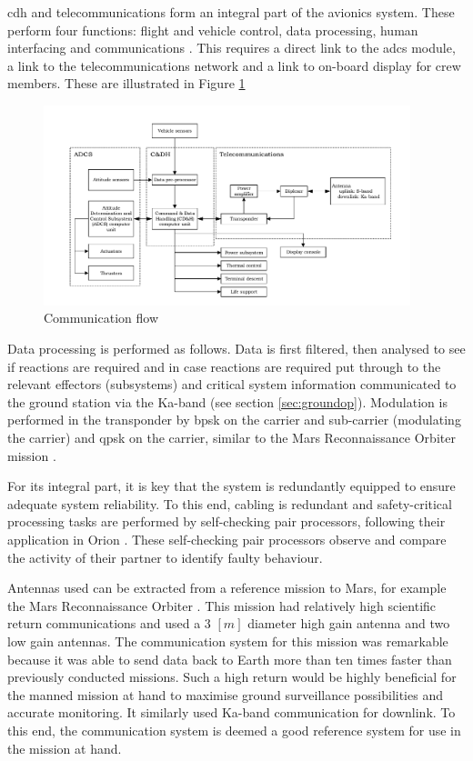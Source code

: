 \acrfull{cdh} and telecommunications form an integral part of the avionics system. These perform four functions: flight and vehicle control, data processing, human interfacing and communications \cite{Eger2008}. This requires a direct link to the \gls{adcs} module, a link to the telecommunications network and a link to on-board display for crew members. These are illustrated in Figure \ref{fig:cdhflow}

\begin{figure}[h]
		\centering
		\includegraphics[width=0.95\textwidth]{./Figure/CrewModule/CDH.pdf}
		\caption{Communication flow}
		\label{fig:cdhflow}
\end{figure}

Data processing is performed as follows. Data is first filtered, then analysed to see if reactions are required and in case reactions are required put through to the relevant effectors (subsystems) and critical system information communicated to the ground station via the Ka-band (see section \ref{sec:groundop}). Modulation is performed in the transponder by \gls{bpsk} on the carrier and sub-carrier (modulating the carrier) and \gls{qpsk} on the carrier, similar to the Mars Reconnaissance Orbiter mission \cite{Taylor2006}.

For its integral part, it is key that the system is redundantly equipped to ensure adequate system reliability. To this end, cabling is redundant and safety-critical processing tasks are performed by self-checking pair processors, following their application in Orion \cite{Eger2008}. These self-checking pair processors observe and compare the activity of their partner to identify faulty behaviour. 

Antennas used can be extracted from a reference mission to Mars, for example the Mars Reconnaissance Orbiter \cite{Taylor2006}. This mission had relatively high scientific return communications and used a $3$ $[m]$ diameter high gain antenna and two low gain antennas. The communication system for this mission was remarkable because it was able to send data back to Earth more than ten times faster than previously conducted missions. Such a high return would be highly beneficial for the manned mission at hand to maximise ground surveillance possibilities and accurate monitoring. It similarly used Ka-band communication for downlink. To this end, the communication system is deemed a good reference system for use in the mission at hand.

